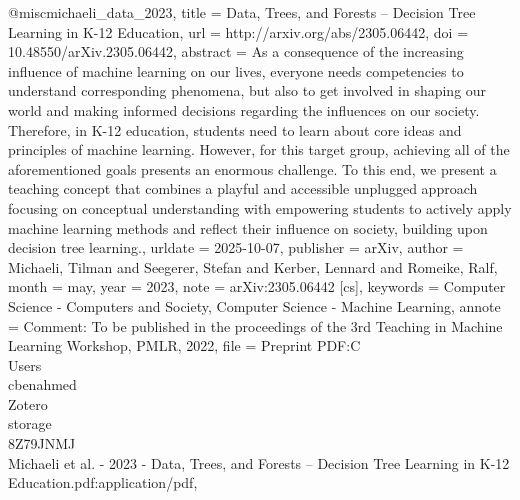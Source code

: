 @misc{michaeli_data_2023,
	title = {Data, {Trees}, and {Forests} -- {Decision} {Tree} {Learning} in {K}-12 {Education}},
	url = {http://arxiv.org/abs/2305.06442},
	doi = {10.48550/arXiv.2305.06442},
	abstract = {As a consequence of the increasing influence of machine learning on our lives, everyone needs competencies 
to understand corresponding phenomena, but also to get involved in shaping our world and making informed decisions regarding the 
influences on our society. Therefore, in K-12 education, students need to learn about core ideas and principles of machine 
learning. However, for this target group, achieving all of the aforementioned goals presents an enormous challenge. To this end, 
we present a teaching concept that combines a playful and accessible unplugged approach focusing on conceptual understanding 
with empowering students to actively apply machine learning methods and reflect their influence on society, building upon 
decision tree learning.},
	urldate = {2025-10-07},
	publisher = {arXiv},
	author = {Michaeli, Tilman and Seegerer, Stefan and Kerber, Lennard and Romeike, Ralf},
	month = may,
	year = {2023},
	note = {arXiv:2305.06442 [cs]},
	keywords = {Computer Science - Computers and Society, Computer Science - Machine Learning},
	annote = {Comment: To be published in the proceedings of the 3rd Teaching in Machine Learning Workshop, PMLR, 2022},
	file = {Preprint PDF:C\:\\Users\\cbenahmed\\Zotero\\storage\\8Z79JNMJ\\Michaeli et al. - 2023 - Data, Trees, and Forests 
-- Decision Tree Learning in K-12 Education.pdf:application/pdf},
}

